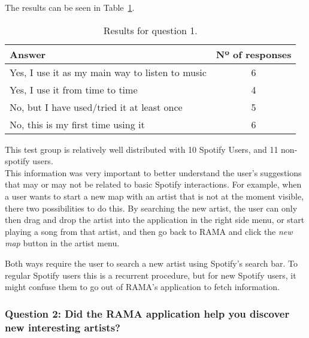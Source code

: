       The results can be seen in Table~\ref{tab:question1}.

      \begin{table}[H]
         \begin{center}
           \begin{tabular}{l|c}
       
           \hline
           \textbf{Answer} & \textbf{Nº of responses} \\
           \hline

           \hline
              Yes, I use it as my main way to listen to music & 6 \\
              Yes, I use it from time to time & 4 \\
              No, but I have used/tried it at least once & 5 \\
              No, this is my first time using it & 6 \\
           \hline
           \end{tabular}
         \end{center}
         \caption{Results for question 1.}
         \label{tab:question1}
       \end{table}

      This test group is relatively well distributed with 10 Spotify Users, and 11 non-spotify users. \\

      This information was very important to better understand the user's suggestions that may or may not be related to basic Spotify interactions.
      For example, when a user wants to start a new map with an artist that is not at the moment visible, there two possibilities to do this.
      By searching the new artist, the user can only then drag and drop the artist into the application in the right side menu, or start playing a song from that artist, and then go back to RAMA and click the \emph{new map} button in the artist menu.

      Both ways require the user to search a new artist using Spotify's search bar.
      To regular Spotify users this is a recurrent procedure, but for new Spotify users, it might confuse them to go out of RAMA's application to fetch information.
    
    \subsubsection{Question 2: Did the RAMA application help you discover new interesting artists?}
    \label{ssub:question_2}

